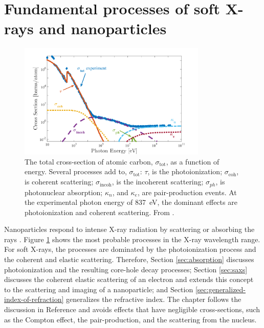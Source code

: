 \section{Fundamental processes of soft X-rays and nanoparticles}\label{sec:light-matter-interaction}
\begin{figure}
	\centering
		\includegraphics[width=0.80\textwidth]{images/absorption-cross-section-carbon-ken.jpg}
	\caption[Total cross-section of atomic carbon.]{The total cross-section of atomic carbon, $\sigma_{\text{tot}}$, as a function of energy. Several processes add to, $\sigma_{\text{tot}}$: $\tau$, is the photoionization; $\sigma_{\text{coh}}$, is coherent scattering; $\sigma_{\text{incoh}}$, is the incoherent scattering; $\sigma_{ph}$, is photonuclear absorption; $\kappa_{n}$, and $\kappa_{e}$, are pair-production events. At the experimental photon energy of \SI{837}{\electronvolt}, the dominant effects are photoionization and coherent scattering. From \citep{Ferguson-2016-PhD,Williams-2009-xb}.}
	\label{fig:absorption-cross-section-carbon-ken}
\end{figure}
%
Nanoparticles respond to intense X-ray radiation by scattering or absorbing the rays \cite{Als-Nielson-2011-JWS}. Figure \ref{fig:absorption-cross-section-carbon-ken} shows the most probable processes in the X-ray wavelength range. For soft X-rays, the processes are dominated by the photoionization process and the coherent and elastic scattering. Therefore, Section \ref{sec:absorption} discusses photoionization and the resulting core-hole decay processes; Section \ref{sec:saxs} discusses the coherent elastic scattering of an electron and extends this concept to the scattering and imaging of a nanoparticle; and Section \ref{sec:generalized-index-of-refraction} generalizes the refractive index. The chapter follows the discussion in Reference \citep{Als-Nielson-2011-JWS} and avoids effects that have negligible cross-sections, such as the Compton effect, the pair-production, and the scattering from the nucleus.
